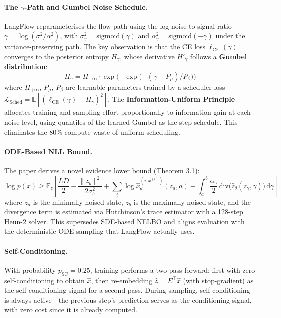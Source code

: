 \documentclass[11pt]{article}
\begin{document}
\paragraph{The $\gamma$-Path and Gumbel Noise Schedule.}
LangFlow reparameterises the flow path using the log noise-to-signal ratio $\gamma = \log(\sigma^2 / \alpha^2)$, with $\sigma_\gamma^2 = \mathrm{sigmoid}(\gamma)$ and $\alpha_\gamma^2 = \mathrm{sigmoid}(-\gamma)$ under the variance-preserving path. The key observation is that the CE loss $\ell_{\mathrm{CE}}(\gamma)$ converges to the posterior entropy $H_\gamma$, whose derivative $H'_\gamma$ follows a \textbf{Gumbel distribution}:
\begin{equation}
    H_\gamma = H_{+\infty} \cdot \exp\!\Big({-\exp\!\big({-(\gamma - P_\mu) / P_\beta}\big)}\Big)
\end{equation}
where $H_{+\infty}$, $P_\mu$, $P_\beta$ are learnable parameters trained by a scheduler loss $\mathcal{L}_{\mathrm{Sched}} = \mathbb{E}[(\ell_{\mathrm{CE}}(\gamma) - H_\gamma)^2]$. The \textbf{Information-Uniform Principle} allocates training and sampling effort proportionally to information gain at each noise level, using quantiles of the learned Gumbel as the step schedule. This eliminates the 80\% compute waste of uniform scheduling.

\paragraph{ODE-Based NLL Bound.}
The paper derives a novel evidence lower bound (Theorem 3.1):
\begin{equation}
    \log p(x) \geq \mathbb{E}_z\!\left[\frac{LD}{2} - \frac{\|z_b\|^2}{2\sigma_b^2} + \sum_i \log \hat{x}_\theta^{(i, x^{(i)})}(z_a, a) - \int_a^b \frac{\alpha_\gamma}{2}\,\mathrm{div}\!\big(\hat{z}_\theta(z_\gamma, \gamma)\big)\,\mathrm{d}\gamma\right]
\end{equation}
where $z_a$ is the minimally noised state, $z_b$ is the maximally noised state, and the divergence term is estimated via Hutchinson's trace estimator with a 128-step Heun-2 solver. This supersedes SDE-based NELBO and aligns evaluation with the deterministic ODE sampling that LangFlow actually uses.

\paragraph{Self-Conditioning.}
With probability $p_{\mathrm{SC}} = 0.25$, training performs a two-pass forward: first with zero self-conditioning to obtain $\hat{x}$, then re-embedding $\hat{z} = E^\top \hat{x}$ (with stop-gradient) as the self-conditioning signal for a second pass. During sampling, self-conditioning is always active---the previous step's prediction serves as the conditioning signal, with zero cost since it is already computed.
\end{document}
